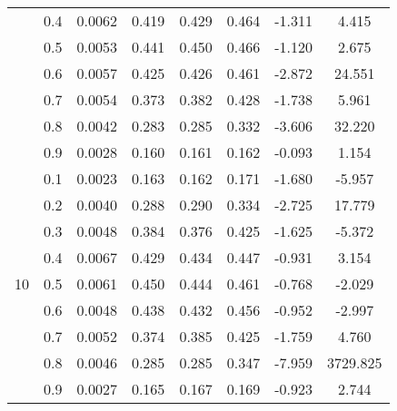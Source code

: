 \documentclass[11pt,a4paper]{report}
\begin{document}
\begin{longtable}{ | c | c || c | c | c | c | c | c | }
 & 0.4 & 0.0062 & 0.419 & 0.429 & 0.464 & -1.311 & 4.415 \\
 & 0.5 & 0.0053 & 0.441 & 0.450 & 0.466 & -1.120 & 2.675 \\
 & 0.6 & 0.0057 & 0.425 & 0.426 & 0.461 & -2.872 & 24.551 \\
 & 0.7 & 0.0054 & 0.373 & 0.382 & 0.428 & -1.738 & 5.961 \\
 & 0.8 & 0.0042 & 0.283 & 0.285 & 0.332 & -3.606 & 32.220 \\
 & 0.9 & 0.0028 & 0.160 & 0.161 & 0.162 & -0.093 & 1.154 \\
 \hline
\multirow{9}{*}{10} & 0.1 & 0.0023 & 0.163 & 0.162 & 0.171 & -1.680 & -5.957 \\
 & 0.2 & 0.0040 & 0.288 & 0.290 & 0.334 & -2.725 & 17.779 \\
 & 0.3 & 0.0048 & 0.384 & 0.376 & 0.425 & -1.625 & -5.372 \\
 & 0.4 & 0.0067 & 0.429 & 0.434 & 0.447 & -0.931 & 3.154 \\
 & 0.5 & 0.0061 & 0.450 & 0.444 & 0.461 & -0.768 & -2.029 \\
 & 0.6 & 0.0048 & 0.438 & 0.432 & 0.456 & -0.952 & -2.997 \\
 & 0.7 & 0.0052 & 0.374 & 0.385 & 0.425 & -1.759 & 4.760 \\
 & 0.8 & 0.0046 & 0.285 & 0.285 & 0.347 & -7.959 & 3729.825 \\
 & 0.9 & 0.0027 & 0.165 & 0.167 & 0.169 & -0.923 & 2.744 \\
 \hline
\hline
\end{longtable}
\end{document}
